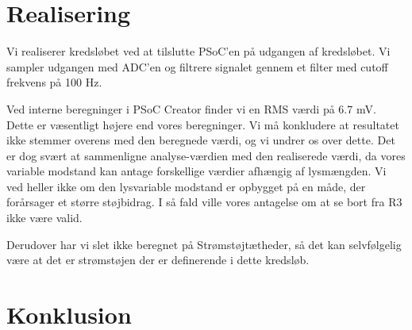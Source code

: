 \documentclass[a4paper, 11pt, article,oneside,openany]{memoir} %
\begin{document}
\section{Realisering}

Vi realiserer kredsløbet ved at tilslutte PSoC'en på udgangen af kredsløbet. Vi sampler udgangen med ADC'en og filtrere signalet gennem et filter med cutoff frekvens på 100 Hz.

Ved interne beregninger i PSoC Creator finder vi en RMS værdi på 6.7 mV. Dette er væsentligt højere end vores beregninger. Vi må konkludere at resultatet ikke stemmer overens med den beregnede værdi, og vi undrer os over dette. Det er dog svært at sammenligne analyse-værdien med den realiserede værdi, da vores variable modstand kan antage forskellige værdier afhængig af lysmængden. Vi ved heller ikke om den lysvariable modstand er opbygget på en måde, der forårsager et større støjbidrag. I så fald ville vores antagelse om at se bort fra R3 ikke være valid.

Derudover har vi slet ikke beregnet på Strømstøjtætheder, så det kan selvfølgelig være at det er strømstøjen der er definerende i dette kredsløb.

\section{Konklusion}
\end{document}
